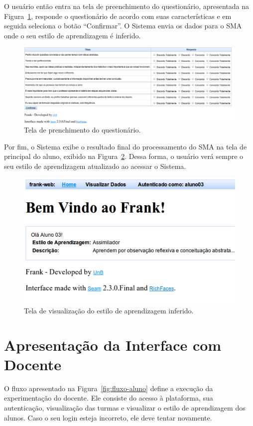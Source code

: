 O usuário então entra na tela de preenchimento do questionário, apresentada na Figura~\ref{fig:frank-tela-aluno-preencher-questionario}, responde o questionário de acordo com suas características e em seguida seleciona o botão ``Confirmar''. O Sistema envia os dados para o SMA onde o seu estilo de aprendizagem é inferido.

\begin{figure}
	\centering
	\includegraphics[scale=0.4]{images/frank-tela-aluno-preencher-questionario.png}
	\caption{Tela de prenchimento do questionário.}
	\label{fig:frank-tela-aluno-preencher-questionario}
\end{figure}

Por fim, o Sistema exibe o resultado final do processamento do SMA na tela de principal do aluno, exibido na Figura~\ref{fig:frank-tela-aluno-inferencia-estilo}. Dessa forma, o usuário verá sempre o seu estilo de aprendizagem atualizado ao acessar o Sistema.

\begin{figure}
	\centering
	\includegraphics[scale=0.6]{images/frank-tela-aluno-inferencia-estilo.png}
	\caption{Tela de visualização do estilo de aprendizagem inferido.}
	\label{fig:frank-tela-aluno-inferencia-estilo}
\end{figure}

\section{Apresentação da Interface com Docente}\label{section:interface-docente}
O fluxo apresentado na Figura~\ref{fig:fluxo-aluno} define a execução da experimentação do docente. Ele consiste do acesso à plataforma, sua autenticação, visualização das turmas e visualizar o estilo de aprendizagem dos alunos. Caso o seu login esteja incorreto, ele deve tentar novamente.

